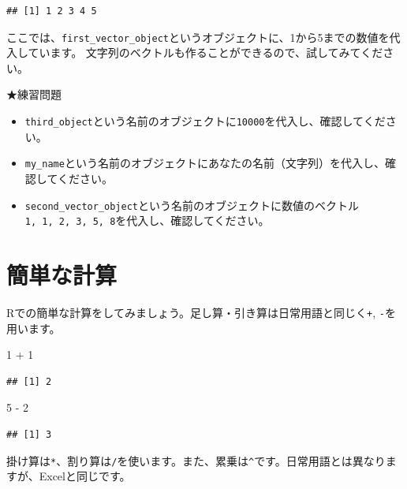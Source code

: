 \documentclass[
]{book}
\newenvironment{Shaded}{\begin{snugshade}}{\end{snugshade}}
\newcommand{\DecValTok}[1]{\textcolor[rgb]{0.00,0.00,0.81}{#1}}
\newcommand{\SpecialCharTok}[1]{\textcolor[rgb]{0.00,0.00,0.00}{#1}}
\providecommand{\tightlist}{%
  \setlength{\itemsep}{0pt}\setlength{\parskip}{0pt}}
\begin{document}
\begin{verbatim}
## [1] 1 2 3 4 5
\end{verbatim}

ここでは、\texttt{first\_vector\_object}というオブジェクトに、1から5までの数値を代入しています。
文字列のベクトルも作ることができるので、試してみてください。

★練習問題

\begin{itemize}
\tightlist
\item
  \texttt{third\_object}という名前のオブジェクトに\texttt{10000}を代入し、確認してください。
\item
  \texttt{my\_name}という名前のオブジェクトにあなたの名前（文字列）を代入し、確認してください。
\item
  \texttt{second\_vector\_object}という名前のオブジェクトに数値のベクトル\texttt{1,\ 1,\ 2,\ 3,\ 5,\ 8}を代入し、確認してください。
\end{itemize}

\hypertarget{ux7c21ux5358ux306aux8a08ux7b97}{%
\section{簡単な計算}\label{ux7c21ux5358ux306aux8a08ux7b97}}

Rでの簡単な計算をしてみましょう。足し算・引き算は日常用語と同じく\texttt{+}, \texttt{-}を用います。

\begin{Shaded}
\begin{Highlighting}[]
\DecValTok{1} \SpecialCharTok{+} \DecValTok{1}
\end{Highlighting}
\end{Shaded}

\begin{verbatim}
## [1] 2
\end{verbatim}

\begin{Shaded}
\begin{Highlighting}[]
\DecValTok{5} \SpecialCharTok{{-}} \DecValTok{2}
\end{Highlighting}
\end{Shaded}

\begin{verbatim}
## [1] 3
\end{verbatim}

掛け算は\texttt{*}、割り算は\texttt{/}を使います。また、累乗は\texttt{\^{}}です。日常用語とは異なりますが、Excelと同じです。
\end{document}

